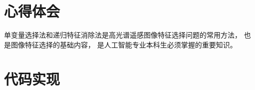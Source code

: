 \documentclass[cn,hazy,blue,14pt,normal]{elegantnote}
\begin{document}
\section{心得体会}
单变量选择法和递归特征消除法是高光谱遥感图像特征选择问题的常用方法，
也是图像特征选择的基础内容，
是人工智能专业本科生必须掌握的重要知识。

\appendix

\section{代码实现}

\end{document}

